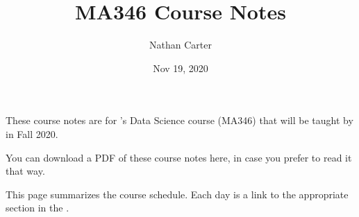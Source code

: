 \documentclass[letterpaper,10pt,english]{sphinxmanual}
\title{MA346 Course Notes}
\date{Nov 19, 2020}
\author{Nathan Carter}
\begin{document}
\pagestyle{empty}
\sphinxmaketitle
\pagestyle{plain}
\sphinxtableofcontents
\pagestyle{normal}
\label{\detokenize{intro::doc}}


These course notes are for ’s Data Science course (MA346) that will be taught by  in Fall 2020.

You can download a PDF of these course notes here, in case you prefer to read it that way.

This page summarizes the course schedule.  Each day is a link to the appropriate section in the {\hyperref[\detokenize{course-schedule::doc}]{}}.
\end{document}
